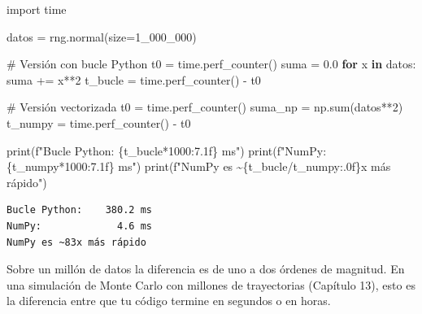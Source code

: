 \documentclass[
  spanish,
  letterpaper,
  DIV=11,
  numbers=noendperiod]{scrreprt}
\newenvironment{Shaded}{\begin{snugshade}}{\end{snugshade}}
\newcommand{\BuiltInTok}[1]{\textcolor[rgb]{0.00,0.23,0.31}{#1}}
\newcommand{\CommentTok}[1]{\textcolor[rgb]{0.37,0.37,0.37}{#1}}
\newcommand{\ControlFlowTok}[1]{\textcolor[rgb]{0.00,0.23,0.31}{\textbf{#1}}}
\newcommand{\DecValTok}[1]{\textcolor[rgb]{0.68,0.00,0.00}{#1}}
\newcommand{\FloatTok}[1]{\textcolor[rgb]{0.68,0.00,0.00}{#1}}
\newcommand{\ImportTok}[1]{\textcolor[rgb]{0.00,0.46,0.62}{#1}}
\newcommand{\KeywordTok}[1]{\textcolor[rgb]{0.00,0.23,0.31}{\textbf{#1}}}
\newcommand{\NormalTok}[1]{\textcolor[rgb]{0.00,0.23,0.31}{#1}}
\newcommand{\OperatorTok}[1]{\textcolor[rgb]{0.37,0.37,0.37}{#1}}
\newcommand{\SpecialCharTok}[1]{\textcolor[rgb]{0.37,0.37,0.37}{#1}}
\newcommand{\SpecialStringTok}[1]{\textcolor[rgb]{0.13,0.47,0.30}{#1}}
\begin{document}
\label{benchmark}
\begin{Shaded}
\begin{Highlighting}[]
\ImportTok{import}\NormalTok{ time}

\NormalTok{datos }\OperatorTok{=}\NormalTok{ rng.normal(size}\OperatorTok{=}\DecValTok{1\_000\_000}\NormalTok{)}

\CommentTok{\# Versión con bucle Python}
\NormalTok{t0 }\OperatorTok{=}\NormalTok{ time.perf\_counter()}
\NormalTok{suma }\OperatorTok{=} \FloatTok{0.0}
\ControlFlowTok{for}\NormalTok{ x }\KeywordTok{in}\NormalTok{ datos:}
\NormalTok{    suma }\OperatorTok{+=}\NormalTok{ x}\OperatorTok{**}\DecValTok{2}
\NormalTok{t\_bucle }\OperatorTok{=}\NormalTok{ time.perf\_counter() }\OperatorTok{{-}}\NormalTok{ t0}

\CommentTok{\# Versión vectorizada}
\NormalTok{t0 }\OperatorTok{=}\NormalTok{ time.perf\_counter()}
\NormalTok{suma\_np }\OperatorTok{=}\NormalTok{ np.}\BuiltInTok{sum}\NormalTok{(datos}\OperatorTok{**}\DecValTok{2}\NormalTok{)}
\NormalTok{t\_numpy }\OperatorTok{=}\NormalTok{ time.perf\_counter() }\OperatorTok{{-}}\NormalTok{ t0}

\BuiltInTok{print}\NormalTok{(}\SpecialStringTok{f"Bucle Python:  }\SpecialCharTok{\{}\NormalTok{t\_bucle}\OperatorTok{*}\DecValTok{1000}\SpecialCharTok{:7.1f\}}\SpecialStringTok{ ms"}\NormalTok{)}
\BuiltInTok{print}\NormalTok{(}\SpecialStringTok{f"NumPy:         }\SpecialCharTok{\{}\NormalTok{t\_numpy}\OperatorTok{*}\DecValTok{1000}\SpecialCharTok{:7.1f\}}\SpecialStringTok{ ms"}\NormalTok{)}
\BuiltInTok{print}\NormalTok{(}\SpecialStringTok{f"NumPy es \textasciitilde{}}\SpecialCharTok{\{}\NormalTok{t\_bucle}\OperatorTok{/}\NormalTok{t\_numpy}\SpecialCharTok{:.0f\}}\SpecialStringTok{x más rápido"}\NormalTok{)}
\end{Highlighting}
\end{Shaded}

\begin{verbatim}
Bucle Python:    380.2 ms
NumPy:             4.6 ms
NumPy es ~83x más rápido
\end{verbatim}

Sobre un millón de datos la diferencia es de uno a dos órdenes de
magnitud. En una simulación de Monte Carlo con millones de trayectorias
(Capítulo 13), esto es la diferencia entre que tu código termine en
segundos o en horas.
\end{document}
